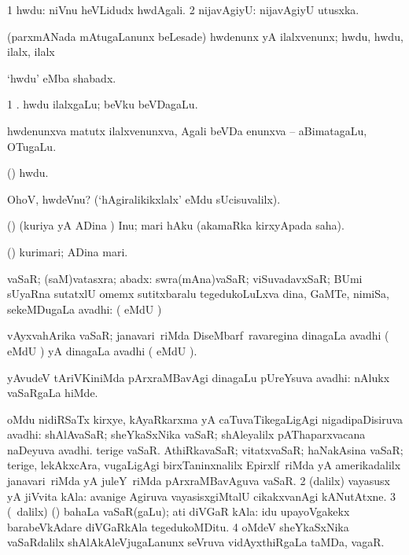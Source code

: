 \bentry
{} 
\gl{\kirxvi} 
\bmng
\bnum
\num{1} hwdu:  niVnu heVLidudx hwdAgali. 
\num{2} nijavAgiyU:   nijavAgiyU  utusxka.
\enum
\emng

\noindent
\gl{\pagu} 
\bmng
{} (parxmANada mAtugaLanunx beLesade) hwdenunx yA ilalxvenunx; hwdu, hwdu, ilalx, ilalx
\emng
\eentry

\bentry
{} 
\gl{\nA} 
\bmng
`hwdu'  eMba shabadx.
\emng

\noindent
\gl{\pagu}
\bmng
\bnum
\num{1}  .
 
\banum
{} hwdu ilalxgaLu; beVku beVDagaLu. 

 hwdenunxva matutx  ilalxvenunxva, Agali beVDa enunxva -- aBimatagaLu, OTugaLu.
\eanum
\numie
\enum
\emng
\eentry

\bentry
{} 
\gl{\kirxvi} 
\bmng
(\AmA) hwdu.
\emng

\noindent
\gl{\pagu}
\bmng
{} OhoV, hwdeVnu? (`hAgiralikikxlalx' eMdu sUcisuvalilx).
\emng
\eentry

\bentry
{} 
\gl{\akirx} 
\bmng
(\pArxparx) 
(kuriya yA ADina \vi) Inu; mari hAku (akamaRka kirxyApada saha).
\emng
\eentry

\bentry
{} 
\gl{\nA} 
\bmng
(\pArxparx)
kurimari; ADina mari.
\emng
\eentry

\bentry
{} 
\gl{\nA}
\bmng
\bnum
{}
vaSaR; (saM)vatasxra; abadx:
\banum
{} swra(mAna)vaSaR; viSuvadavxSaR; BUmi sUyaRna sutatxlU omemx sutitxbaralu  tegedukoLuLxva  dina,  GaMTe,  nimiSa,  sekeMDugaLa avadhi: ( eMdU \parx) 

 vAyxvahArika vaSaR; janavari \,riMda DiseMbarf \,ravaregina  dinagaLa avadhi ( eMdU \parx) yA   dinagaLa avadhi ( eMdU \parx). 

 yAvudeV tAriVKiniMda pArxraMBavAgi  dinagaLu pUreYsuva avadhi:  nAlukx vaSaRgaLa hiMde. 

 oMdu nidiRSaTx kirxye, kAyaRkarxma yA caTuvaTikegaLigAgi nigadipaDisiruva avadhi:  shAlAvaSaR; sheYkaSxNika vaSaR; shAleyalilx pAThaparxvacana naDeyuva avadhi.  terige vaSaR.   AthiRkavaSaR; vitatxvaSaR; haNakAsina vaSaR; terige, lekAkxcAra, \mo vugaLigAgi birxTaninxnalilx Epirxlf \,riMda yA amerikadalilx janavari \,riMda yA juleY \,riMda pArxraMBavAguva vaSaR. 
\eanum
\numie
\num{2} (\bava dalilx) vayasusx yA jiVvita kAla:  avanige Agiruva vayasisxgiMtalU cikakxvanAgi kANutAtxne.   
\num{3} (\sA\ \bava dalilx) (\AmA) bahaLa vaSaR(gaLu); ati diVGaR kAla:    idu upayoVgakekx barabeVkAdare diVGaRkAla tegedukoMDitu.  
\num{4} oMdeV sheYkaSxNika vaSaRdalilx shAlAkAleVjugaLanunx seVruva vidAyxthiRgaLa taMDa, vagaR.
\enum
\emng 


